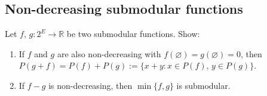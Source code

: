 \documentclass{article}
\let\emptyset\varnothing
\newcommand{\R}{\mathbb{R}}
\begin{document}
  \subsection{Non-decreasing submodular functions}
  \begin{centerframebox}
    Let $f,\, g : 2^E \to \R$ be two submodular functions. Show:

    \begin{enumerate}[label=(\roman*)]
      \item If $f$ and $g$ are also non-decreasing with $f(\emptyset) = g(\emptyset) = 0$,
      then $P(g+f) = P(f) + P(g) := \{x+y : x \in P(f),\, y \in P(g)\}$.
      \item If $f - g$ is non-decreasing, then $\min\{f,g\}$ is submodular.
    \end{enumerate}
  \end{centerframebox}
\end{document}
